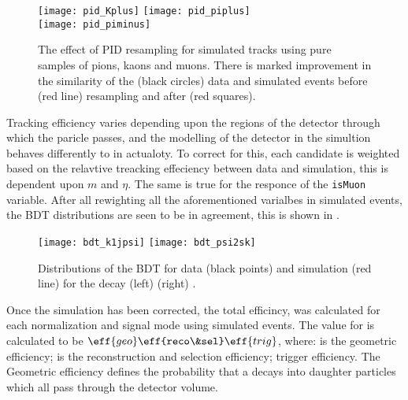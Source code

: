 \begin{figure}
  \begin{center}
    \texttt{[image: pid\_Kplus]}
    \texttt{[image: pid\_piplus]}\\
    \texttt{[image: pid\_piminus]}
    \caption[Effect of resampling PID variables in simulation]
    {\small
      The effect of PID resampling for simulated tracks using pure samples of pions, kaons and
      muons.
      There is marked improvement in the similarity of the (black circles) \btojpsikpipi data and
      simulated events before (red line) resampling and after (red squares).
    }
    \label{fig:hhh:pid}
  \end{center}
\end{figure}


Tracking efficiency varies depending upon the regions of the detector through which the paricle
passes, and the modelling of the detector in the simultion behaves differently to in actualoty.
To correct for this, each candidate is weighted based on the relavtive treacking effeciency between
data and simulation, this is dependent upon $m$ and $\eta$.
The same is true for the responce of the {\tt isMuon} variable.
After all rewighting all the aforementioned varialbes in simulated events, the BDT distributions
are seen to be in agreement, this is shown in .

\begin{figure}
  \begin{center}
    \texttt{[image: bdt\_k1jpsi]}
    \texttt{[image: bdt\_psi2sk]}
    \caption[BDT distributions in data and simulation]
    {\small
      Distributions of the BDT for data (black points) and simulation (red line) for the decay
      (left) 
      (right) \btopsitwosk.
    }
    \label{fig:kpipi:bdt}
  \end{center}
\end{figure}


Once the simulation has been corrected, the total efficincy,  was calculated for each
normalization and signal mode using simulated events.
The value for  is calculated to be $\eff{geo}\eff{reco\&sel}\eff{trig}$, where:
 is the geometric efficiency;
 is the reconstruction and selection efficiency;
 trigger efficiency.
The Geometric efficiency defines the probability that a \Bp decays into daughter particles which
all pass through the \lhcb detector volume.

